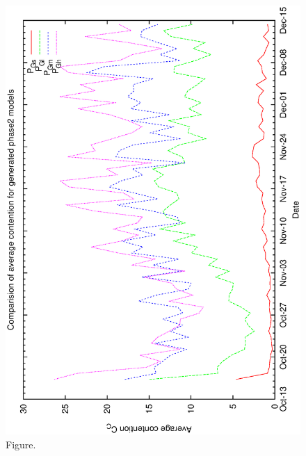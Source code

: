 \documentclass[12pt,a4paper]{article}
\begin{document}
\begin{figure}[htbp]
 \begin{center}
  \includegraphics[scale=1.0, angle=0]{figures/c60_gen_cav.eps}
 \end{center}
  \caption[Figure.]
{Figure.}
\end{figure}
\clearpage
\end{document}
